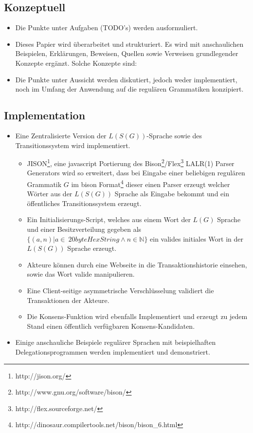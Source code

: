 \documentclass[]{article}
\begin{document}
\subsection*{Konzeptuell}
\begin{itemize}
  \item Die Punkte unter Aufgaben (TODO's) werden ausformuliert.
  \item Dieses Papier wird überarbeitet und strukturiert. Es wird mit anschaulichen Beispielen, Erklärungen, Beweisen,  Quellen sowie Verweisen grundlegender Konzepte ergänzt. Solche Konzepte sind: 
  \item Die Punkte unter Aussicht werden diskutiert, jedoch weder implementiert, noch im Umfang der Anwendung auf die regulären Grammatiken konzipiert.
\end{itemize}


\subsection*{Implementation}
\begin{itemize}
  \item Eine Zentralisierte Version der $L(S(G))$-Sprache sowie des Transitionssystem wird implementiert.
  \begin{itemize}
    \item JISON\footnote{http://jison.org/}, eine javascript Portierung des Bison\footnote{http://www.gnu.org/software/bison/}/Flex\footnote{http://flex.sourceforge.net/} LALR(1) Parser Generators wird so erweitert, dass bei Eingabe einer beliebigen regulären Grammatik $G$ im bison Format\footnote{http://dinosaur.compilertools.net/bison/bison\_6.html} dieser einen Parser erzeugt welcher Wörter aus der $L(S(G))$ Sprache als Eingabe bekommt und ein öffentliches Transitionssystem erzeugt.
    \item Ein Initialisierungs-Script, welches aus einem Wort der $L(G)$ Sprache und einer Besitzverteilung gegeben als $\{(a,n)| a\in\ 20byteHexString \land n\in \mathbb{N} \}$ ein valides initiales Wort in der $L(S(G))$ Sprache erzeugt.
    \item Akteure können durch eine Webseite in die Transaktionshistorie einsehen, sowie das Wort valide manipulieren.
    \item Eine Client-seitige asymmetrische Verschlüsselung validiert die Transaktionen der Akteure.
    \item Die Konsens-Funktion wird ebenfalls Implementiert und erzeugt zu jedem Stand einen öffentlich verfügbaren Konsens-Kandidaten.
  \end{itemize}
  \item Einige anschauliche Beispiele regulärer Sprachen mit beispielhaften Delegationsprogrammen werden implementiert und demonstriert.
\end{itemize}
\end{document}
